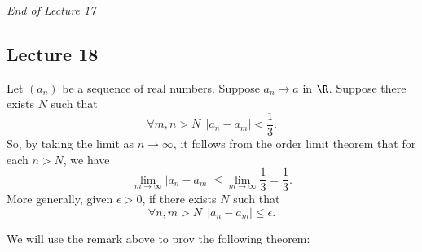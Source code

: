 \begin{center}
    \textit{End of Lecture 17} 
\end{center}


\subsection{Lecture 18}

 \begin{remark}\label{Useful Observation}
    Let \( ({a}_{n}) \) be a sequence of real numbers. Suppose \( {a}_{n} \to a  \) in \( \R  \). Suppose there exists \( N \) such that  
    \[  \forall m, n > N  \ \ | {a}_{n} - {a}_{m} | < \frac{ 1 }{ 3 }. \]
    So, by taking the limit as \( n \to \infty   \), it follows from the order limit theorem that for each \( n > N  \), we have 
    \[  \lim_{ m \to \infty  }  | {a}_{n} - {a}_{m} |  \leq \lim_{ m \to \infty  }  \frac{ 1 }{ 3 } = \frac{ 1 }{ 3 }. \]
    More generally, given \( \epsilon > 0  \), if there exists \( N  \) such that
    \[  \forall n,m > N \ \ | {a}_{n} - {a}_{m} |  \leq \epsilon. \]
 \end{remark}

 We will use the remark above to prov the following theorem: 

